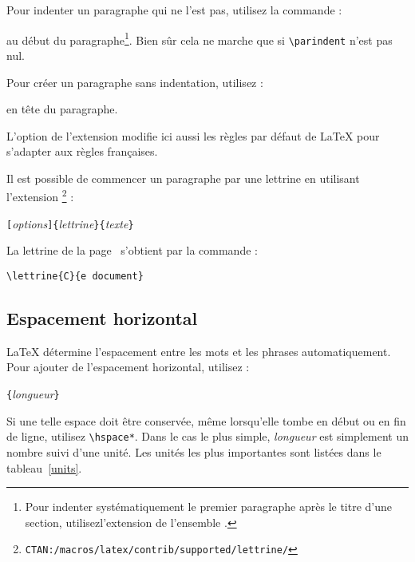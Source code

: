 Pour indenter un paragraphe qui ne l'est pas, utilisez la commande :
\begin{lscommand}
\end{lscommand}
\noindent au début du paragraphe\footnote{Pour indenter
 systématiquement le premier
 paragraphe après le titre d'une section, utilisez\footnotemark l'extension
  de l'ensemble .}. Bien sûr cela ne
 marche que si \verb|\parindent| n'est pas nul.

Pour créer un paragraphe sans indentation, utilisez :
\begin{lscommand}
\end{lscommand}
\noindent 
en tête du paragraphe. 

L'option  de l'extension  modifie ici aussi
les règles par défaut de 
\LaTeX{} pour s'adapter aux règles françaises. 

Il est possible de commencer un paragraphe par une lettrine en utilisant
l'extension %
\footnote{\texttt{CTAN:/macros/latex/contrib/supported/lettrine/}} :
\begin{lscommand}
\verb|[|\emph{options}\verb|]{|\emph{lettrine}\verb|}|\verb|{|\emph{texte}\verb|}|
\end{lscommand} 
La lettrine de la page~\pageref{lettrine} s'obtient par la commande :
\begin{code}
\verb|\lettrine{C}{e document}|
\end{code}

\subsection{Espacement horizontal}
\label{sec:hspace}

\LaTeX{} détermine l'espacement entre les mots et les phrases
automatiquement. Pour ajouter de l'espacement horizontal, utilisez :
\begin{lscommand}
\verb|{|\emph{longueur}\verb|}|
\end{lscommand}
Si une telle espace doit être conservée, même lorsqu'elle tombe en début ou en
fin de ligne, utilisez \verb|\hspace*|. Dans le cas le plus simple,
\emph{longueur} est simplement un nombre suivi d'une unité. Les unités
les plus importantes sont listées dans le tableau~\ref{units}.

